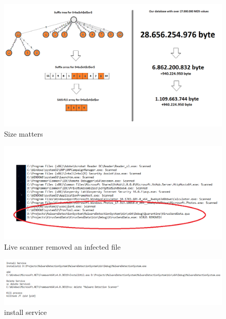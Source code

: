 \documentclass[12pt]{article} %
\begin{document}
\begin{figure}[H]
    \centering
    \includegraphics[width=1.0\textwidth]{sizematters}
    \captionsetup{width=0.8\textwidth}
    \caption{Size matters}
    \label{fig:sizematters}
\end{figure}


\begin{figure}[H]
    \centering
    \includegraphics[width=1.0\textwidth]{quarantine}
    \captionsetup{width=0.8\textwidth}
    \caption{Live scanner removed an infected file}
    \label{fig:quarantine}
\end{figure}

\begin{figure}[H]
    \centering
    \includegraphics[width=1.0\textwidth]{importantcommands}
    \captionsetup{width=0.8\textwidth}
    \caption{install service}
    \label{fig:importantcommands}
\end{figure}
\end{document}
